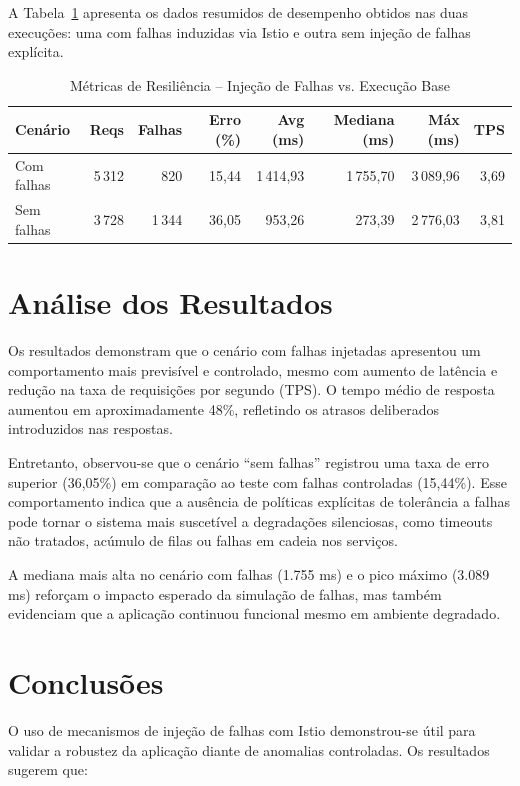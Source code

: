\documentclass[12pt,a4paper]{report}
\begin{document}
A Tabela~\ref{tab:resiliencia} apresenta os dados resumidos de desempenho obtidos nas duas execuções: uma com falhas induzidas via Istio e outra sem injeção de falhas explícita.

\begin{table}[H]
\centering
\caption{Métricas de Resiliência – Injeção de Falhas vs. Execução Base}
\label{tab:resiliencia}
\begin{tabular}{@{}lrrrrrrr@{}}
\toprule
Cenário     & Reqs  & Falhas & Erro (\%) & Avg (ms) & Mediana (ms) & Máx (ms) & TPS \\
\midrule
Com falhas  & 5\,312 & 820    & 15,44     & 1\,414,93 & 1\,755,70     & 3\,089,96 & 3,69 \\
Sem falhas  & 3\,728 & 1\,344  & 36,05     & 953,26    & 273,39        & 2\,776,03 & 3,81 \\
\bottomrule
\end{tabular}
\end{table}

\section{Análise dos Resultados}

Os resultados demonstram que o cenário com falhas injetadas apresentou um comportamento mais previsível e controlado, mesmo com aumento de latência e redução na taxa de requisições por segundo (TPS). O tempo médio de resposta aumentou em aproximadamente 48\%, refletindo os atrasos deliberados introduzidos nas respostas.

Entretanto, observou-se que o cenário “sem falhas” registrou uma taxa de erro superior (36,05\%) em comparação ao teste com falhas controladas (15,44\%). Esse comportamento indica que a ausência de políticas explícitas de tolerância a falhas pode tornar o sistema mais suscetível a degradações silenciosas, como timeouts não tratados, acúmulo de filas ou falhas em cadeia nos serviços.

A mediana mais alta no cenário com falhas (1.755 ms) e o pico máximo (3.089 ms) reforçam o impacto esperado da simulação de falhas, mas também evidenciam que a aplicação continuou funcional mesmo em ambiente degradado.

\section{Conclusões}

O uso de mecanismos de injeção de falhas com Istio demonstrou-se útil para validar a robustez da aplicação diante de anomalias controladas. Os resultados sugerem que:
\end{document}
